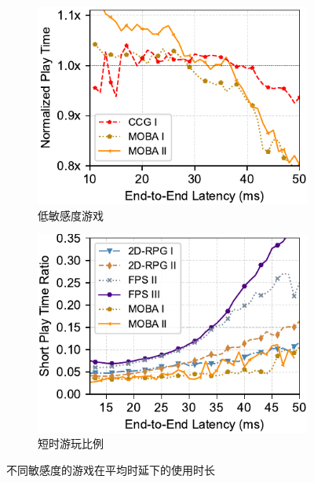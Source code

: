 \begin{figure}[htbp]
\begin{subfigure}[t]{0.4\linewidth}
  \centering
  \includegraphics[width=\linewidth]{figures/chap03/measurement_data/delay-not-sensitive.pdf}
  \caption{低敏感度游戏}
  \label{fig-real-measurement-results-Low-Delay-Sensitivity-Games}
\end{subfigure}%
\begin{subfigure}[t]{0.4\linewidth}
  \centering
  \includegraphics[width=\linewidth]{figures/chap03/measurement_data/early_quit_ratio.pdf}
  \caption{短时游玩比例}
  \label{fig-real-measurement-results-Short-Play-Time-of Games}
\end{subfigure}

\caption{不同敏感度的游戏在平均时延下的使用时长}
\label{fig:measurement-result}
\end{figure}
